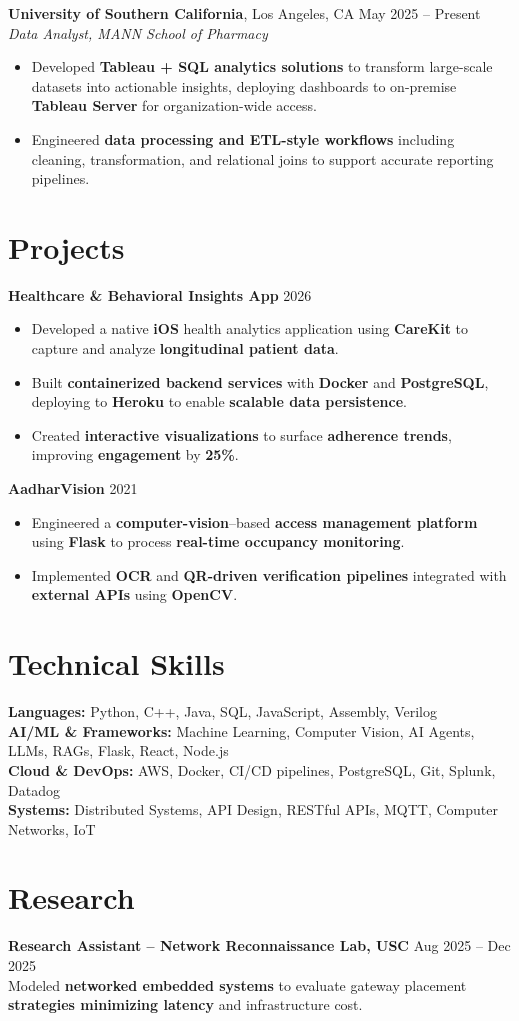 \documentclass[letterpaper,11pt]{article}
\begin{document}
\textbf{University of Southern California}, Los Angeles, CA \hfill May 2025 -- Present \\
\textit{Data Analyst, MANN School of Pharmacy}
\begin{itemize}
    \item Developed \textbf{Tableau + SQL analytics solutions} to transform large-scale datasets into actionable insights, deploying dashboards to on-premise \textbf{Tableau Server} for organization-wide access.
    \item Engineered \textbf{data processing and ETL-style workflows} including cleaning, transformation, and relational joins to support accurate reporting pipelines.
\end{itemize}

\section*{Projects}
\textbf{Healthcare \& Behavioral Insights App} \hfill 2026 \\
\begin{itemize}
    \item Developed a native \textbf{iOS} health analytics application using \textbf{CareKit} to capture and analyze \textbf{longitudinal patient data}.
    \item Built \textbf{containerized backend services} with \textbf{Docker} and \textbf{PostgreSQL}, deploying to \textbf{Heroku} to enable \textbf{scalable data persistence}.
    \item Created \textbf{interactive visualizations} to surface \textbf{adherence trends}, improving \textbf{engagement} by \textbf{25\%}.
\end{itemize}

\textbf{AadharVision} \hfill 2021 \\
\begin{itemize}
    \item Engineered a \textbf{computer-vision}–based \textbf{access management platform} using \textbf{Flask} to process \textbf{real-time occupancy monitoring}.
    \item Implemented \textbf{OCR} and \textbf{QR-driven verification pipelines} integrated with \textbf{external APIs} using \textbf{OpenCV}.
\end{itemize}

\section*{Technical Skills}
\textbf{Languages:} Python, C++, Java, SQL, JavaScript, Assembly, Verilog \\
\textbf{AI/ML \& Frameworks:} Machine Learning, Computer Vision, AI Agents, LLMs, RAGs, Flask, React, Node.js \\
\textbf{Cloud \& DevOps:} AWS, Docker, CI/CD pipelines, PostgreSQL, Git, Splunk, Datadog \\
\textbf{Systems:} Distributed Systems, API Design, RESTful APIs, MQTT, Computer Networks, IoT

\section*{Research}
\textbf{Research Assistant – Network Reconnaissance Lab, USC} \hfill Aug 2025 -- Dec 2025 \\
Modeled \textbf{networked embedded systems} to evaluate gateway placement \textbf{strategies minimizing latency} and infrastructure cost.
\end{document}

